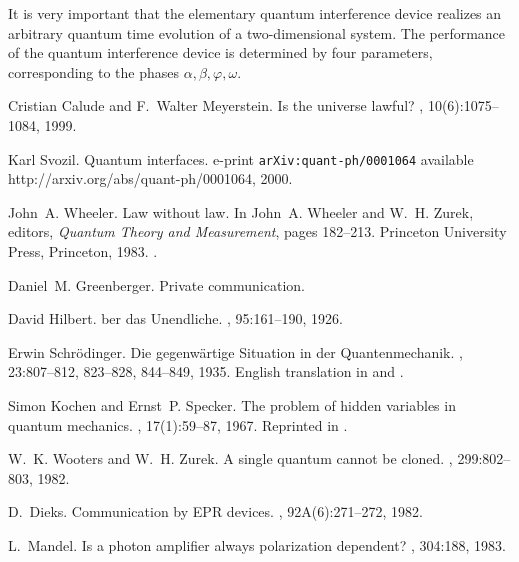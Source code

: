 \documentclass [11pt]{llncs}
\begin{document}
It is very important that the elementary quantum
interference device realizes an arbitrary
quantum time evolution  of a two-dimensional system.
The  performance of the quantum interference device is determined by
four parameters, corresponding to the phases
$\alpha ,\beta ,\varphi, \omega$.


%
%
%

\begin{thebibliography}{10}

Cristian Calude and F.~Walter Meyerstein.
\newblock Is the universe lawful?
, 10(6):1075--1084, 1999.

Karl Svozil.
\newblock Quantum interfaces.
\newblock e-print {\tt arXiv:quant-ph/0001064} available
  {http://arxiv.org/abs/quant-ph/0001064}, 2000.

John~A. Wheeler.
\newblock Law without law.
\newblock In John~A. Wheeler and W.~H. Zurek, editors, {\em Quantum Theory and
  Measurement}, pages 182--213. Princeton University Press, Princeton, 1983.
\newblock \cite{wheeler-Zurek:83}.

Daniel~M. Greenberger.
\newblock Private communication.

David Hilbert.
ber das {U}nendliche.
, 95:161--190, 1926.

Erwin Schr{\"{o}}dinger.
\newblock Die gegenw{\"{a}}rtige {S}ituation in der {Q}uantenmechanik.
, 23:807--812, 823--828, 844--849, 1935.
\newblock English translation in \cite{trimmer} and \cite[pp.
  152-167]{wheeler-Zurek:83}.

Simon Kochen and Ernst~P. Specker.
\newblock The problem of hidden variables in quantum mechanics.
, 17(1):59--87, 1967.
\newblock Reprinted in \cite[pp. 235--263]{specker-ges}.

W.~K. Wooters and W.~H. Zurek.
\newblock A single quantum cannot be cloned.
, 299:802--803, 1982.

D.~Dieks.
\newblock Communication by {EPR} devices.
, 92A(6):271--272, 1982.

L.~Mandel.
\newblock Is a photon amplifier always polarization dependent?
, 304:188, 1983.


\end{thebibliography}
\end{document}
